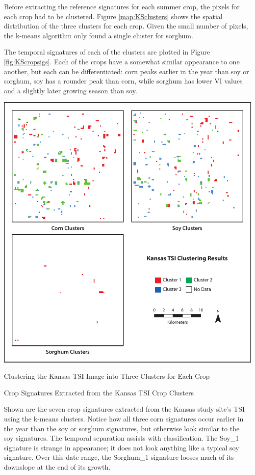Before extracting the reference signatures for each summer crop, the pixels for each crop had to be clustered. Figure \ref{map:KSclusters} shows the spatial distribution of the three clusters for each crop. Given the small number of pixels, the k-means algorithm only found a single cluster for sorghum.

The temporal signatures of each of the clusters are plotted in Figure \ref{fig:KScropsigs}. Each of the crops have a somewhat similar appearance to one another, but each can be differentiated: corn peaks earlier in the year than soy or sorghum, soy has a rounder peak than corn, while sorghum has lower VI values and a slightly later growing season than soy.

\begin{ssfigure}
  \centering
  \includegraphics[width=\textwidth]{Graphics/KSclustered.pdf}
  \caption{Clustering the Kansas TSI Image into Three Clusters for Each Crop}
  \label{map:KSclusters}
\end{ssfigure}


\begin{ssfigure}
  \centering
  
  \caption{Crop Signatures Extracted from the Kansas TSI Crop Clusters}
  \medskip
  \small
  Shown are the seven crop signatures extracted from the Kansas study site's TSI using the k-means clusters. Notice how all three corn signatures occur earlier in the year than the soy or sorghum signatures, but otherwise look similar to the soy signatures. The temporal separation assists with classification. The Soy\_1 signature is strange in appearance; it does not look anything like a typical soy signature. Over this date range, the Sorghum\_1 signature looses much of its downslope at the end of its growth.
  \label{fig:KScropsigs}
\end{ssfigure}


